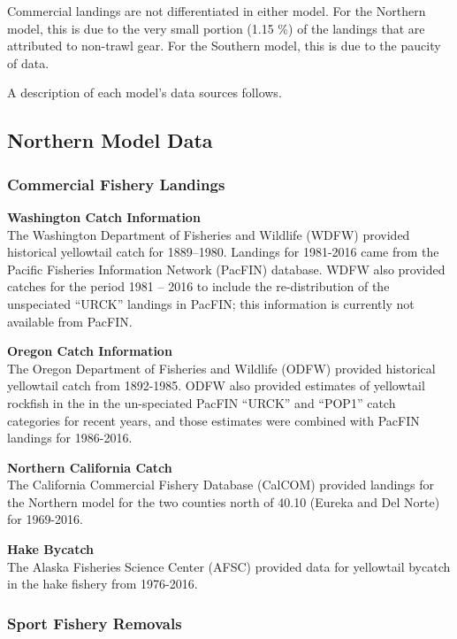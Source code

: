 \documentclass[12pt,]{article}
\begin{document}
Commercial landings are not differentiated in either model. For the
Northern model, this is due to the very small portion (1.15 \%) of the
landings that are attributed to non-trawl gear. For the Southern model,
this is due to the paucity of data.

A description of each model's data sources follows.

\subsection{Northern Model Data}\label{northern-model-data}

\subsubsection{Commercial Fishery
Landings}\label{commercial-fishery-landings}

\textbf{Washington Catch Information}\\
The Washington Department of Fisheries and Wildlife (WDFW) provided
historical yellowtail catch for 1889--1980. Landings for 1981-2016 came
from the Pacific Fisheries Information Network (PacFIN) database. WDFW
also provided catches for the period 1981 -- 2016 to include the
re-distribution of the unspeciated ``URCK'' landings in PacFIN; this
information is currently not available from PacFIN.

\textbf{Oregon Catch Information}\\
The Oregon Department of Fisheries and Wildlife (ODFW) provided
historical yellowtail catch from 1892-1985. ODFW also provided estimates
of yellowtail rockfish in the in the un-speciated PacFIN ``URCK'' and
``POP1'' catch categories for recent years, and those estimates were
combined with PacFIN landings for 1986-2016.

\textbf{Northern California Catch}\\
The California Commercial Fishery Database (CalCOM) provided landings
for the Northern model for the two counties north of 40.10 (Eureka and
Del Norte) for 1969-2016.

\textbf{Hake Bycatch}\\
The Alaska Fisheries Science Center (AFSC) provided data for yellowtail
bycatch in the hake fishery from 1976-2016.

\subsubsection{Sport Fishery Removals}\label{sport-fishery-removals}
\end{document}
